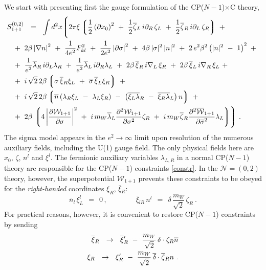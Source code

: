 \documentclass[12pt]{article}
\newcommand{\ntwoo}{${\mathcal N}= \left(0,2\right) $ }
\newcommand{\p}{\partial}
\newcommand{\ov}{\overline}
\newcommand{\mc}[1]{\mathcal{#1}}
\newcommand{\lgr}{\left\lgroup}
\newcommand{\rgr}{\right\rgroup}
\newcommand{\bxir}{\ov{\xi}{}_R}
\newcommand{\xir}{\xi_R}
\newcommand{\bzr}{\ov{\zeta}{}_R}
\newcommand{\nbar}{\ov{n}}
\newcommand{\CPC}{CP($N-1$)$\times$C }
\begin{document}
	We start with presenting first the gauge formulation of the \CPC theory,
\begin{align*}
%
	& S_{1+1}^{(0,2)} ~~=~~ \int d^2 x 
\Biggl \lgroup
	2\pi\xi \lgr \frac 1 2 \left (\p x_0\right)^2 ~+~
		      \frac 1 2 \ov{\zeta}{}_L\, i\p_R\, \zeta_L ~+~
			\frac 1 2 \ov {\zeta}{}_R\, i\p_L\, \zeta_R
		\rgr
	~+~ \\
%
&
	\;\;
	~+~
	2\beta \left| \nabla n \right|^2 ~+~ \frac{1}{4e^2} F_{kl}^2
			~+~ \frac{1}{2e^2} \left|\p \sigma\right|^2 ~+~
	4\beta\, |\sigma|^2\, |n|^2 ~+~
	2\, e^2\beta^2 \left( |n|^2 ~-~ 1 \right)^2 ~+~\\
%
&
	\;\;
	~+~
	\frac{1}{e^2} \ov{\lambda}{}_R\, i\p_L \lambda_R ~+~
	\frac{1}{e^2} \ov{\lambda}{}_L\, i\p_R \lambda_L ~+~
	2\beta\, \ov{\xi}{}_R\, i\nabla_L\, \xi_R ~+~
	2\beta\, \ov{\xi}{}_L\, i\nabla_R\, \xi_L ~+~ \\
%
&
	\;\;
	~+~
	i\,\sqrt{2}\,2\beta \lgr \sigma\, \ov{\xi}{}_R\xi_L ~+~ 
				\ov{\sigma}\,\ov{\xi}{}_L\xi_R \rgr ~+~ \\
%
&
	\;\;
	~+~
	i\,\sqrt{2}\,2\beta 
		\lgr \ov{n} \left( \lambda_R \xi_L ~-~ \lambda_L\xi_R \right)
		~-~ \left( \ov{\xi_L\lambda}{}_R ~-~ \ov{\xi_R\lambda}{}_L \right) n \rgr 
	~+~\\
%
&	
	\;\;
	~+~
	2\beta\,
	\lgr 4 \left | \frac{\p \mc{W}_{1+1}}{\p\sigma} \right |^2 
		~+~ i\, m_W \ov{\lambda}_L \frac{\p^2 \mc{W}_{1+1}}{\p \sigma^2} \zeta_R 
	~+~ i\, m_W \ov{\zeta}{}_R \frac{\p^2 \ov{\mc{W}}{}_{1+1}}{\p\ov{\sigma}^2} \lambda_L 
	\rgr
	\Biggr \rgroup~.
\end{align*}
	The sigma model appears in the $ e^2 \to \infty $ limit upon resolution of the numerous auxiliary fields, 
	including the U(1) gauge field.
	The only physical fields here are $ x_0 $, $ \zeta $, $ n^l $ and $ \xi^l $.
	The fermionic auxiliary variables $ \lambda_{L,R} $ in a normal CP($N-1$) theory are responsible for 
	the CP($N-1$) constraints \eqref{constr}.
	In the \ntwoo theory, however, the superpotential $ \mathcal{W}_{1+1} $ prevents these constraints to be
	obeyed for the {\it right-handed} coordinates $ \xir $, $ \bxir $:
\[
	\nbar{}_l\, \xi_L^l ~~=~~ 0\,, \qquad\qquad  
	\ov{\xi}{}_{lR}\, n^l ~~=~~ \delta\, \frac{m_W}{\sqrt{2}}\, \zeta_R~.
\]
	For practical reasons, however, it is convenient to restore CP($N-1$) constraints by sending
\begin{align}
%
\notag
	\bxir ~~\to~~ \bxir' ~-~ \frac{m_W}{\sqrt{2}}\, \delta \cdot \zeta_R\ov{n} \\
%
\label{shift}
	\xi_R ~~\to~~ \xi_R' ~-~ \frac{m_W}{\sqrt{2}}\, \ov{\delta} \cdot \bzr n~.
\end{align}
\end{document}

